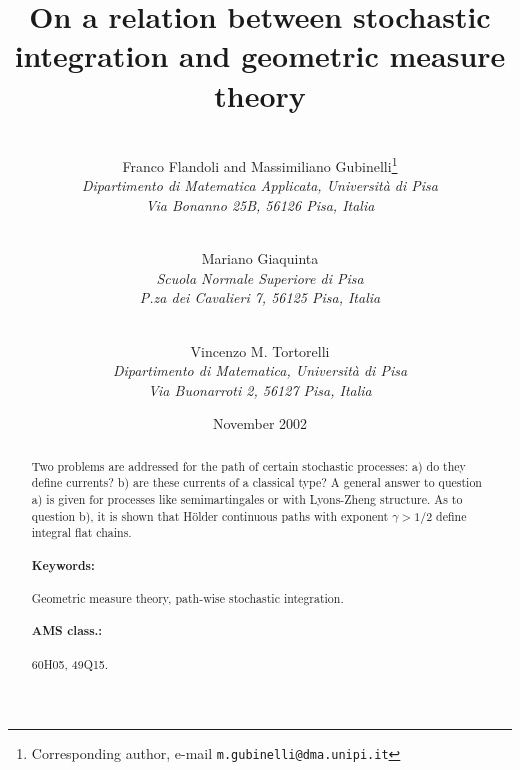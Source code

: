 \documentclass{article}
\begin{document}
\title{On a relation between stochastic integration and geometric measure theory}
\author{
\\
  { Franco Flandoli and Massimiliano Gubinelli\footnote{Corresponding
      author, e-mail {\tt m.gubinelli@dma.unipi.it}} }              \\
  {\small\it Dipartimento di Matematica Applicata,
Universit\`{a} di Pisa}    \\[-0.1cm]
  {\small\it Via Bonanno 25B, 56126 Pisa, Italia}          \\[-0.1cm]
  \\[-0.1cm]  \and
  { Mariano Giaquinta }              \\
  {\small\it Scuola Normale Superiore di Pisa }    \\[-0.1cm]
  {\small\it P.za dei Cavalieri  7, 56125 Pisa, Italia}          \\[-0.1cm]
  \\[-0.1cm]  \and
  { Vincenzo M. Tortorelli }              \\
  {\small\it  Dipartimento di Matematica,
Universit\`{a} di Pisa }    \\[-0.1cm]
  {\small\it Via Buonarroti  2, 56127 Pisa, Italia}          \\[-0.1cm]
}
\date{November 2002}
\maketitle

\begin{abstract}
Two problems are addressed for the path of certain stochastic processes: a)
do they define currents? b) are these currents of a classical type? A
general answer to question a) is given for processes like semimartingales or
with Lyons-Zheng structure. As to question b), it is shown that H\"{o}lder
continuous paths with exponent $\gamma > 1/2$
define integral flat chains.
\paragraph{Keywords:} 
Geometric measure theory, path-wise stochastic integration.
\paragraph{AMS class.:} 60H05,
49Q15. 
\end{abstract}
\end{document}
